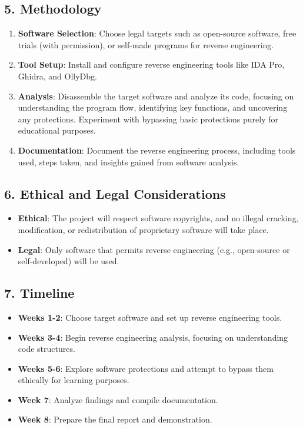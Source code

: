 \documentclass{article}
\begin{document}
\subsection*{5. Methodology}
\begin{enumerate}
    \item \textbf{Software Selection}: Choose legal targets such as open-source software, free trials (with permission), or self-made programs for reverse engineering.
    \item \textbf{Tool Setup}: Install and configure reverse engineering tools like IDA Pro, Ghidra, and OllyDbg.
    \item \textbf{Analysis}: Disassemble the target software and analyze its code, focusing on understanding the program flow, identifying key functions, and uncovering any protections. Experiment with bypassing basic protections purely for educational purposes.
    \item \textbf{Documentation}: Document the reverse engineering process, including tools used, steps taken, and insights gained from software analysis.
\end{enumerate}

\subsection*{6. Ethical and Legal Considerations}
\begin{itemize}
    \item \textbf{Ethical}: The project will respect software copyrights, and no illegal cracking, modification, or redistribution of proprietary software will take place.
    \item \textbf{Legal}: Only software that permits reverse engineering (e.g., open-source or self-developed) will be used.
\end{itemize}

\subsection*{7. Timeline}
\begin{itemize}
    \item \textbf{Weeks 1-2}: Choose target software and set up reverse engineering tools.
    \item \textbf{Weeks 3-4}: Begin reverse engineering analysis, focusing on understanding code structures.
    \item \textbf{Weeks 5-6}: Explore software protections and attempt to bypass them ethically for learning purposes.
    \item \textbf{Week 7}: Analyze findings and compile documentation.
    \item \textbf{Week 8}: Prepare the final report and demonstration.
\end{itemize}
\end{document}
